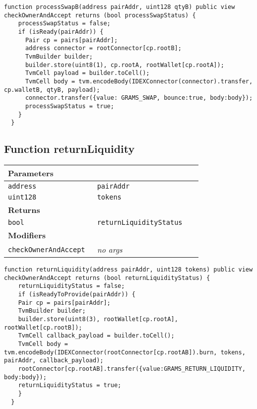 \begin{lstlisting}[firstnumber=236]
  function processSwapB(address pairAddr, uint128 qtyB) public view checkOwnerAndAccept returns (bool processSwapStatus) {
    processSwapStatus = false;
    if (isReady(pairAddr)) {
      Pair cp = pairs[pairAddr];
      address connector = rootConnector[cp.rootB];
      TvmBuilder builder;
      builder.store(uint8(1), cp.rootA, rootWallet[cp.rootA]);
      TvmCell payload = builder.toCell();
      TvmCell body = tvm.encodeBody(IDEXConnector(connector).transfer, cp.walletB, qtyB, payload);
      connector.transfer({value: GRAMS_SWAP, bounce:true, body:body});
      processSwapStatus = true;
    }
  }
\end{lstlisting}

\subsection{Function returnLiquidity}


\ifsoltables
\noindent\begin{tabular}{|l|l|p{5cm}|}\hline
\multicolumn{3}{|l|}{\bf Parameters}\\\hline
\tt address & \tt pairAddr &\\\hline
\tt uint128 & \tt tokens &\\\hline
\multicolumn{3}{|l|}{\bf Returns}\\\hline
\tt bool & \tt returnLiquidityStatus &\\\hline
\multicolumn{3}{|l|}{\bf Modifiers}\\\hline
\tt checkOwnerAndAccept & {\em no args} &\\\hline
\end{tabular}
\fi



\begin{lstlisting}[firstnumber=272]
  function returnLiquidity(address pairAddr, uint128 tokens) public view checkOwnerAndAccept returns (bool returnLiquidityStatus) {
    returnLiquidityStatus = false;
    if (isReadyToProvide(pairAddr)) {
    Pair cp = pairs[pairAddr];
    TvmBuilder builder;
    builder.store(uint8(3), rootWallet[cp.rootA], rootWallet[cp.rootB]);
    TvmCell callback_payload = builder.toCell();
    TvmCell body = tvm.encodeBody(IDEXConnector(rootConnector[cp.rootAB]).burn, tokens, pairAddr, callback_payload);
    rootConnector[cp.rootAB].transfer({value:GRAMS_RETURN_LIQUIDITY, body:body});
    returnLiquidityStatus = true;
    }
  }
\end{lstlisting}

